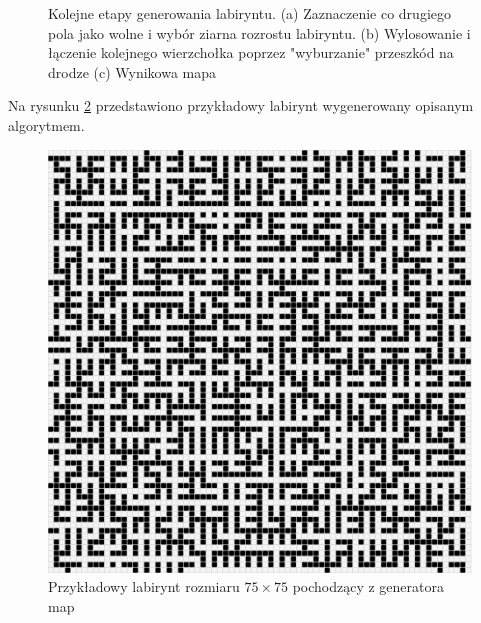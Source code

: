 \begin{figure}
    \centering
        \qquad
        \qquad
    \caption{Kolejne etapy generowania labiryntu.
    (a) Zaznaczenie co drugiego pola jako wolne i wybór ziarna rozrostu labiryntu.
    (b) Wylosowanie i łączenie kolejnego wierzchołka poprzez "wyburzanie" przeszkód na drodze
    (c) Wynikowa mapa}
    \label{fig:etapy-generowania}
\end{figure}

Na rysunku \ref{fig:maze75-75} przedstawiono przykładowy labirynt wygenerowany opisanym algorytmem.
\begin{figure}
	\centering
	\includegraphics[width=0.6\columnwidth]{img/mazegen/maze-75-75}
	\caption{Przykładowy labirynt rozmiaru $75 \times 75$ pochodzący z generatora map}
	\label{fig:maze75-75}
\end{figure}
